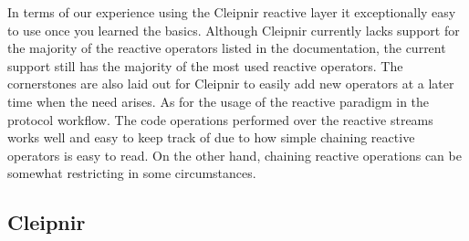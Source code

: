 In terms of our experience using the Cleipnir reactive layer it exceptionally easy to use once you learned the basics. Although Cleipnir currently lacks support for the majority of the reactive operators listed in the documentation, the current support still has the majority of the most used reactive operators. The cornerstones are also laid out for Cleipnir to easily add new operators at a later time when the need arises. As for the usage of the reactive paradigm in the protocol workflow. The code operations performed over the reactive streams works well and easy to keep track of due to how simple chaining reactive operators is easy to read. On the other hand, chaining reactive operations can be somewhat restricting in some circumstances. 

\subsection{Cleipnir}
